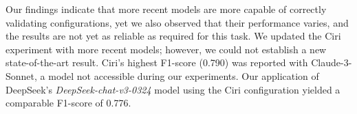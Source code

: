 Our findings indicate that more recent models are more capable of correctly validating configurations, yet we also observed that their performance varies, and the results are not yet as reliable as required for this task. We updated the Ciri experiment with more recent models; however, we could not establish a new state-of-the-art result. Ciri's highest F1-score (0.790) was reported with Claude-3-Sonnet, a model not accessible during our experiments. Our application of DeepSeek's \textit{DeepSeek-chat-v3-0324} model using the Ciri configuration yielded a comparable F1-score of 0.776.